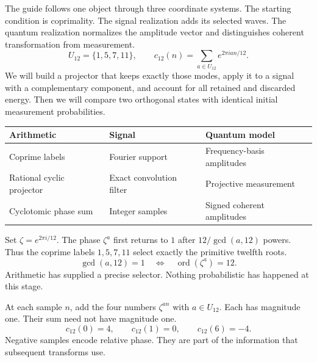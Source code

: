 The guide follows one object through three coordinate systems. The starting condition is coprimality. The signal realization adds its selected waves. The quantum realization normalizes the amplitude vector and distinguishes coherent transformation from measurement.
\[
 U_{12}=\{1,5,7,11\},\qquad
 c_{12}(n)=\sum_{a\in U_{12}}e^{2\pi ian/12}.
\]
We will build a projector that keeps exactly those modes, apply it to a signal with a complementary component, and account for all retained and discarded energy. Then we will compare two orthogonal states with identical initial measurement probabilities.
\begin{center}
\begin{tabular}{lll}\toprule
Arithmetic & Signal & Quantum model\\\midrule
Coprime labels & Fourier support & Frequency-basis amplitudes\\
Rational cyclic projector & Exact convolution filter & Projective measurement\\
Cyclotomic phase sum & Integer samples & Signed coherent amplitudes\\\bottomrule
\end{tabular}
\end{center}

Set $\zeta=e^{2\pi i/12}$. The phase $\zeta^a$ first returns to $1$ after $12/\gcd(a,12)$ powers. Thus the coprime labels $1,5,7,11$ select exactly the primitive twelfth roots.
\[
 \gcd(a,12)=1\quad\Longleftrightarrow\quad\operatorname{ord}(\zeta^a)=12.
\]
Arithmetic has supplied a precise selector. Nothing probabilistic has happened at this stage.

At each sample $n$, add the four numbers $\zeta^{an}$ with $a\in U_{12}$. Each has magnitude one. Their sum need not have magnitude one.
\[
 c_{12}(0)=4,\qquad c_{12}(1)=0,\qquad c_{12}(6)=-4.
\]
Negative samples encode relative phase. They are part of the information that subsequent transforms use.

